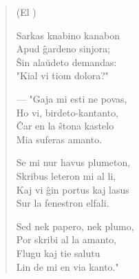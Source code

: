 \begin{verse}
\begin{center}
\footnotesize (El )
\end{center}
                        Sarkas knabino kanabon\\
                        Apud \^gardeno sinjora;\\
                        \^Sin ala\u udeto demandas:\\
                        "Kial vi tiom dolora?"

                        --- "Gaja mi esti ne povas,\\
                        Ho vi, birdeto-kantanto,\\
                        \^Car en la \^stona kastelo\\
                        Mia suferas amanto.

                        Se mi nur havus plumeton,\\
                        Skribus leteron mi al li,\\
                        Kaj vi \^gin portus kaj lasus\\
                        Sur la fenestron elfali.

                        Sed nek papero, nek plumo,\\
                        Por skribi al la amanto,\\
                        Flugu kaj tie salutu\\
                        Lin de mi en via kanto."

\end{verse}

\smallrule{}